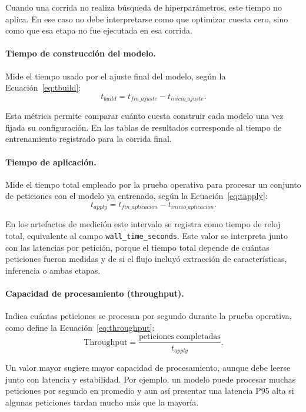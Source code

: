 \documentclass[12pt,oneside]{report}
\begin{document}
Cuando una corrida no realiza búsqueda de hiperparámetros, este tiempo no aplica. En ese caso no debe interpretarse como que optimizar cuesta cero, sino como que esa etapa no fue ejecutada en esa corrida.

\paragraph{Tiempo de construcción del modelo.}
Mide el tiempo usado por el ajuste final del modelo, según la Ecuación~\eqref{eq:tbuild}:
\begin{equation}
\label{eq:tbuild}
t_{build}=t_{fin\_ajuste}-t_{inicio\_ajuste}.
\end{equation}

Esta métrica permite comparar cuánto cuesta construir cada modelo una vez fijada su configuración. En las tablas de resultados corresponde al tiempo de entrenamiento registrado para la corrida final.

\paragraph{Tiempo de aplicación.}
Mide el tiempo total empleado por la prueba operativa para procesar un conjunto de peticiones con el modelo ya entrenado, según la Ecuación~\eqref{eq:tapply}:
\begin{equation}
\label{eq:tapply}
t_{apply}=t_{fin\_aplicacion}-t_{inicio\_aplicacion}.
\end{equation}

En los artefactos de medición este intervalo se registra como tiempo de reloj total, equivalente al campo \texttt{wall\_time\_seconds}. Este valor se interpreta junto con las latencias por petición, porque el tiempo total depende de cuántas peticiones fueron medidas y de si el flujo incluyó extracción de características, inferencia o ambas etapas.

\paragraph{Capacidad de procesamiento (throughput).}
Indica cuántas peticiones se procesan por segundo durante la prueba operativa, como define la Ecuación~\eqref{eq:throughput}:
\begin{equation}
\label{eq:throughput}
\mathrm{Throughput}=\frac{\mathrm{peticiones\ completadas}}{t_{apply}}.
\end{equation}

Un valor mayor sugiere mayor capacidad de procesamiento, aunque debe leerse junto con latencia y estabilidad. Por ejemplo, un modelo puede procesar muchas peticiones por segundo en promedio y aun así presentar una latencia P95 alta si algunas peticiones tardan mucho más que la mayoría.
\end{document}
